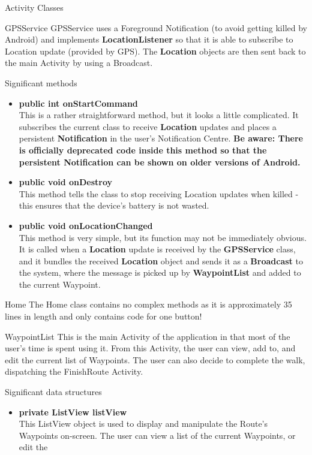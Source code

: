 \documentclass{article}
\begin{document}
\begin{section}{Activity Classes}
		\begin{subsection}{GPSService}
			GPSService uses a Foreground Notification (to avoid getting killed by Android) and implements {\bf LocationListener} so that it is able to subscribe to Location update (provided by GPS). The {\bf Location} objects are then sent back to the main Activity by using a Broadcast.
			\begin{subsubsection}{Significant methods}
				\begin{itemize}
					\item{{\bf public int onStartCommand} \\
					This is a rather straightforward method, but it looks a little complicated. It subscribes the current class to receive {\bf Location} updates and places a persistent {\bf Notification} in the user's Notification Centre. {\bf Be aware: There is officially deprecated code inside this method so that the persistent Notification can be shown on older versions of Android.}}
					\item{{\bf public void onDestroy} \\
					This method tells the class to stop receiving Location updates when killed - this ensures that the device's battery is not wasted.}
					\item{{\bf public void onLocationChanged} \\
					This method is very simple, but its function may not be immediately obvious. It is called when a {\bf Location} update is received by the {\bf GPSService} class, and it bundles the received {\bf Location} object and sends it as a {\bf Broadcast} to the system, where the message is picked up by {\bf WaypointList} and added to the current Waypoint.}
				\end{itemize}			
			\end{subsubsection}
		\end{subsection}
		
		\begin{subsection}{Home}
			The Home class contains no complex methods as it is approximately 35 lines in length and only contains code for one button!
		\end{subsection}
		
		\newpage
		\begin{subsection}{WaypointList}
			This is the main Activity of the application in that most of the user's time is spent using it. From this Activity, the user can view, add to, and edit the current list of Waypoints. The user can also decide to complete the walk, dispatching the FinishRoute Activity.
			\begin{subsubsection}{Significant data structures}
				\begin{itemize}
					\item{{\bf private ListView listView} \\
					This ListView object is used to display and manipulate the Route's Waypoints on-screen. The user can view a list of the current Waypoints, or edit the}
				\end{itemize}
			\end{subsubsection}
			

\end{subsection}
\end{section}
\end{document}
